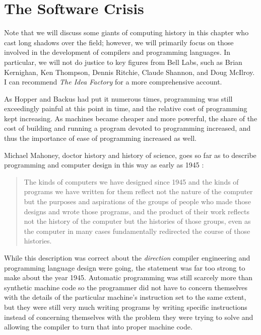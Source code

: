 
\section{The Software Crisis}

Note that we will discuss some giants of computing history in this chapter who cast long
shadows over the field; however, we will primarily focus on those involved in the
development of compilers and programming languages.
In particular, we will not do justice to key figures from Bell Labs, such as
Brian Kernighan, Ken Thompson, Dennis Ritchie, Claude Shannon, and Doug McIlroy.
I can recommend \textit{The Idea Factory} for a more comprehensive account.

As Hopper and Backus had put it numerous times, programming was still exceedingly
painful at this point in time, and the relative cost of programming kept increasing.
As machines became cheaper and more powerful, the share of the cost of building and
running a program devoted to programming increased, and thus the importance of
ease of programming increased as well.

Michael Mahoney, doctor history and history of science, goes so far as to describe programming
and computer design in this way as early as 1945
\cite[The Structures of Computation]{the-first-computers-2002}:
\begin{quotation}
	The kinds of computers we have designed since 1945 and the kinds of programs we have written for
	them reflect not the nature of the computer but the purposes and aspirations of the groups of people
	who made those designs and wrote those programs, and the product of their work reflects not the
	history of the computer but the histories of those groups, even as the computer in many
	cases fundamentally redirected the course of those histories.
\end{quotation}

While this description was correct about the \textit{direction} compiler engineering
and programming language design were going, the statement was far too strong to make
about the year 1945.
Automatic programming was still scarcely more than synthetic machine code so the programmer
did not have to concern themselves with the details of the particular machine's instruction set
to the same extent, but they were still very much writing programs by writing specific instructions
instead of concerning themselves with the problem they were trying to solve and allowing the
compiler to turn that into proper machine code.

